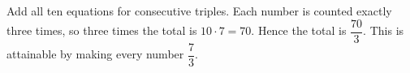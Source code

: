 Add all ten equations for consecutive triples. Each number is counted exactly three times, so three times the total is $10\cdot7=70$. Hence the total is $\boxed{\dfrac{70}{3}}$. This is attainable by making every number $\dfrac{7}{3}$.
